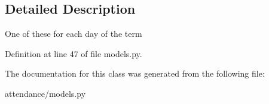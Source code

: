 \subsection{Detailed Description}
\begin{DoxyVerb}One of these for each day of the term
\end{DoxyVerb}
 

Definition at line 47 of file models.\+py.



The documentation for this class was generated from the following file\+:\begin{DoxyCompactItemize}
\item 
attendance/models.\+py\end{DoxyCompactItemize}
